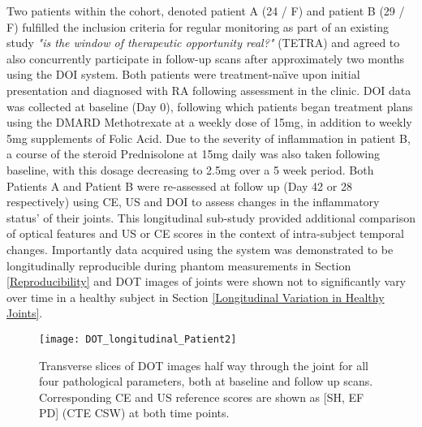 \documentclass[twoside]{bhamthesis}
\theoremstyle{definition}
\begin{document}
Two patients within the cohort, denoted patient A (24 / F) and patient B (29 / F) fulfilled the inclusion criteria for regular monitoring as part of an existing study \textit{"is the window of therapeutic opportunity real?"} (TETRA) and agreed to also concurrently participate in follow-up scans after approximately two months using the DOI system. Both patients were treatment-na\"{\i}ve upon initial presentation and diagnosed with RA following assessment in the clinic. DOI data was collected at baseline (Day 0), following which patients began treatment plans using the DMARD Methotrexate at a weekly dose of 15mg, in addition to weekly 5mg supplements of Folic Acid. Due to the severity of inflammation in patient B, a course of the steroid Prednisolone at 15mg daily was also taken following baseline, with this dosage decreasing to 2.5mg over a 5 week period. Both Patients A and Patient B were re-assessed at follow up (Day 42 or 28 respectively) using CE, US and DOI to assess changes in the inflammatory status' of their joints. This longitudinal sub-study provided additional comparison of optical features and US or CE scores in the context of intra-subject temporal changes. Importantly data acquired using the system was demonstrated to be longitudinally reproducible during phantom measurements in Section \ref{Reproducibility} and DOT images of joints were shown not to significantly vary over time in a healthy subject in Section \ref{Longitudinal Variation in Healthy Joints}.

\begin{figure}[!ht]
\centering\texttt{[image: DOT\_longitudinal\_Patient2]}\caption{Transverse slices of DOT images half way through the joint for all four pathological parameters, both at baseline and follow up scans. Corresponding CE and US reference scores are shown as [SH, EF PD] (CTE CSW) at both time points.}
\label{DOT_longitudinal_Patient}
\end{figure}
\end{document}
